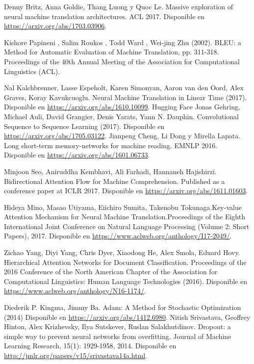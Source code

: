 \documentclass[conference]{IEEEtran}
\begin{document}
\begin{thebibliography}{00}
 Denny Britz, Anna Goldie, Thang Luong y Quoc Le. Massive exploration of neural machine translation architectures. ACL 2017. Disponible en \href{https://arxiv.org/abs/1703.03906}{https://arxiv.org/abs/1703.03906}.

Kishore Papineni , Salim Roukos , Todd Ward , Wei-jing Zhu (2002). BLEU: a Method for Automatic Evaluation of Machine Translation,  pp. 311-318. Proceedings of the 40th Annual Meeting of the Association for Computational Linguistics (ACL). 
 
Nal Kalchbrenner, Lasse Espeholt, Karen Simonyan, Aaron van den Oord, Alex Graves, Koray Kavukcuoglu. Neural Machine Translation in Linear Time (2017). Disponible en \href{https://arxiv.org/abs/1610.10099}{https://arxiv.org/abs/1610.10099}.
Hugging Face
Jonas Gehring, Michael Auli, David Grangier, Denis Yarats, Yann N. Dauphin. Convolutional Sequence to Sequence Learning (2017). Disponible en \href{https://arxiv.org/abs/1705.03122}{https://arxiv.org/abs/1705.03122}.
Jianpeng Cheng, Li Dong y  Mirella Lapata. Long short-term memory-networks for machine reading. EMNLP 2016. Disponible en \href{https://arxiv.org/abs/1601.06733}{https://arxiv.org/abs/1601.06733}.

Minjoon Seo, Aniruddha Kembhavi, Ali Farhadi, Hannaneh Hajishirzi. Bidirectional Attention Flow for Machine Comprehension. Published as a conference paper at ICLR 2017. Disponible en \href{https://arxiv.org/abs/1611.01603}{https://arxiv.org/abs/1611.01603}.

Hideya Mino, Masao Utiyama, Eiichiro Sumita, Takenobu Tokunaga.Key-value Attention Mechanism for Neural Machine Translation.Proceedings of the Eighth International Joint Conference on Natural Language Processing (Volume 2: Short Papers), 2017. Disponible en \href{https://www.aclweb.org/anthology/I17-2049/}{https://www.aclweb.org/anthology/I17-2049/}.

Zichao Yang, Diyi Yang, Chris Dyer, Xiaodong He, Alex Smola, Eduard Hovy. Hierarchical Attention Networks for Document Classification. Proceedings of the 2016 Conference of the North American Chapter of the Association for Computational Linguistics: Human Language Technologies (2016). Disponible en \href{https://www.aclweb.org/anthology/N16-1174/}{https://www.aclweb.org/anthology/N16-1174/}.

Diederik P. Kingma, Jimmy Ba. Adam: A Method for Stochastic Optimization (2014) Disponible en \href{https://arxiv.org/abs/1412.6980}{https://arxiv.org/abs/1412.6980}. 
Nitish Srivastava, Geoffrey Hinton, Alex Krizhevsky, Ilya Sutskever, Ruslan Salakhutdinov. Dropout: a simple way to prevent neural networks from overfitting. Journal of Machine Learning Research, 15(1): 1929-1958, 2014. Disponible en \href{http://jmlr.org/papers/v15/srivastava14a.html}{http://jmlr.org/papers/v15/srivastava14a.html}.


\end{thebibliography}
\end{document}
